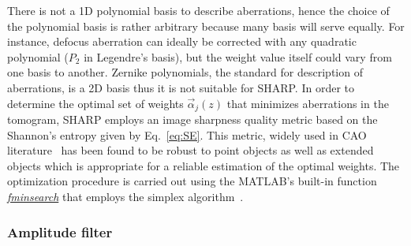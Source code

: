 There is not a 1D polynomial basis to describe aberrations, hence the choice of the polynomial basis is rather arbitrary because many basis will serve equally. For instance, defocus aberration can ideally be corrected with any quadratic polynomial ($P_2$ in Legendre's basis), but the weight value itself could vary from one basis to another. Zernike polynomials, the standard for description of aberrations, is a 2D basis thus it is not suitable for SHARP. In order to determine the optimal set of weights $\vec{\alpha}_j(z)$ that minimizes aberrations in the tomogram, SHARP employs an image sharpness quality metric based on the Shannon's entropy given by Eq.~\eqref{eq:SE}. This metric, widely used in CAO literature~\cite{Liu2011_Automatic, Liu2012_Digital, Hillmann2016_Aberrationfree} has been found to be robust to point objects  as well as extended objects which is appropriate for a reliable estimation of the optimal weights. The optimization procedure is carried out using the MATLAB's built-in function \textit{\href{https://www.mathworks.com/help/optim/ug/fminsearch.html}{fminsearch}} that employs the simplex algorithm~\cite{Lagarias1998_Convergence}.

\subsubsection{Amplitude filter}

